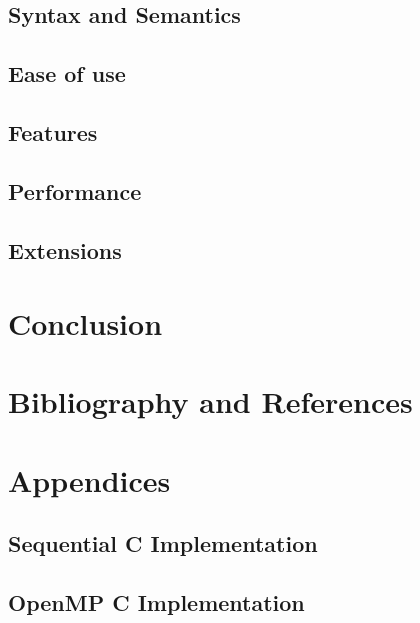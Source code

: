 \documentclass[11pt]{article} %
\begin{document}

\subsection{Syntax and Semantics}
\subsection{Ease of use}
\subsection{Features}
\subsection{Performance}
\subsection{Extensions}


\section{Conclusion}
\section{Bibliography and References}
\nocite{*}


\appendix
\pagebreak
\section{Appendices}
\subsection{Sequential C Implementation}

\pagebreak
\subsection{OpenMP C Implementation}

\pagebreak
\end{document}
